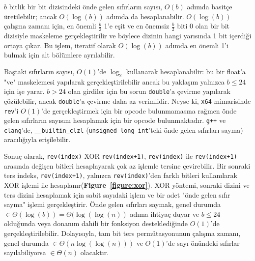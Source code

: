 \documentclass[10pt]{article}
\begin{document}
$b$ bitlik bir bit dizisindeki \"{o}nde gelen s{\i}f{\i}rlar{\i}n say{\i}s{\i}, $O(b)$ ad{\i}mda
basit\c{c}e \"{u}retilebilir; ancak $O(\log(b))$ ad{\i}mda da hesaplanabilir. $O(\log(b))$ 
\c{c}al{\i}\c{s}ma zaman{\i} i\c{c}in, en \"{o}nemli $\frac{b}{2}$ 1'e e\c{s}it ve en \"{o}nemsiz $\frac{b}{2}$ 
biti 0 olan bir bit dizisiyle maskeleme ger\c{c}ekle\c{s}tirilir ve b\"{o}ylece dizinin hangi 
yar{\i}s{\i}nda 1 bit i\c{c}erdi\u{g}i ortaya \c{c}{\i}kar. Bu i\c{s}lem, iteratif olarak $O(\log(b))$ ad{\i}mda
en \"{o}nemli 1'i bulmak i\c{c}in alt b\"{o}l\"{u}mlere ayr{\i}labilir\cite{anderson:bit}.

Ba\c{s}taki s{\i}f{\i}rlar{\i}n say{\i}s{\i}, $O(1)$'de $\log_2$ kullanarak hesaplanabilir: 
bu bir float'a "ve" maskelemesi yap{\i}larak ger\c{c}ekle\c{s}tirilebilir ancak bu
yakla\c{s}{\i}m yaln{\i}zca $b \leq 24$ i\c{c}in i\c{s}e yarar\cite{anderson:bit}. $b > 24$ olan 
girdiler i\c{c}in bu sorun {\tt double}'a \c{c}evirme yap{\i}larak \c{c}\"{o}z\"{u}lebilir, 
ancak {\tt double}'a \c{c}evirme daha az verimlidir. Neyse ki, {\tt x64} 
mimarisinde {\tt rev}'i $O(1)$'de ger\c{c}ekle\c{s}tirmek
i\c{c}in bir opcode bulunmamas{\i}na ra\u{g}men \"{o}nde gelen s{\i}f{\i}rlar{\i}n say{\i}s{\i}n{\i} hesaplamak 
i\c{c}in bir opcode bulunmaktad{\i}r. {\tt g++} ve {\tt clang}'de, {\tt \_\_builtin\_clzl}
({\tt unsigned long int}'teki \"{o}nde gelen s{\i}f{\i}rlar{\i} sayma) arac{\i}l{\i}\u{g}{\i}yla eri\c{s}ilebilir.

Sonu\c{c} olarak, {\tt rev(index)} XOR {\tt rev(index+1)}, {\tt  rev(index)} ile {\tt rev(index+1)}
aras{\i}nda de\u{g}i\c{s}en bitleri hesaplayarak \c{c}ok az i\c{s}lemle tersine \c{c}evirebilir. 
Bir sonraki ters indeks, {\tt  rev(index+1)}, yaln{\i}zca {\tt rev(index)}'den farkl{\i}
bitleri kullan{\i}larak XOR i\c{s}lemi ile hesaplan{\i}r({\bf  Figure~\ref{figure:xor}}). XOR y\"{o}ntemi, 
sonraki dizini ve ters dizini hesaplamak i\c{c}in sabit say{\i}daki i\c{s}lem ve bir adet 
"\"{o}nde gelen s{\i}f{\i}r sayma" i\c{s}lemi ger\c{c}ekle\c{s}tirir. \"{O}nde gelen s{\i}f{\i}rlar{\i} saymak, genel 
durumda $\in \Theta(\log(b)) = \Theta(\log(\log(n))$ ad{\i}ma ihtiya\c{c} duyar ve $b \leq 24$ oldu\u{g}unda
veya donan{\i}m dahili bir fonksiyon destekledi\u{g}inde $O(1)$'de ger\c{c}ekle\c{s}tirilebilir. 
Dolay{\i}s{\i}yla, tam bit ters perm\"{u}tasyonunun \c{c}al{\i}\c{s}ma zaman{\i}, genel durumda 
$\in \Theta(n \log(\log(n)))$ ve $O(1)$'de say{\i} \"{o}n\"{u}ndeki s{\i}f{\i}rlar say{\i}labiliyorsa
$\in \Theta(n)$ olacakt{\i}r.
\end{document}
